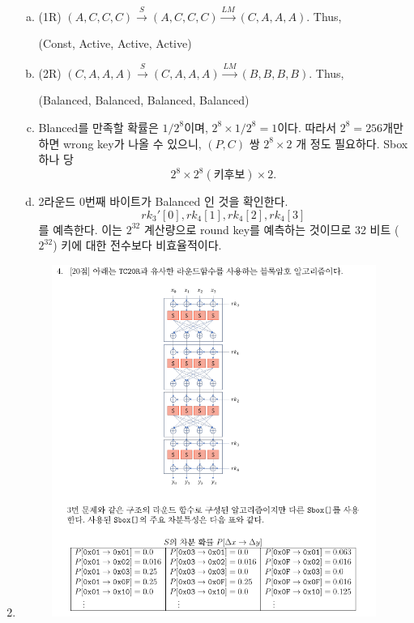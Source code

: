\begin{enumerate}[\bf 1.]
\begin{figure}[h!]
	\end{figure}
	\begin{enumerate}[(a)]
		\item (1R) $(A,C,C,C)\xrightarrow{S}(A,C,C,C)\xrightarrow{LM}(C,A,A,A)$. Thus, \begin{center}
			(Const, Active, Active, Active)
		\end{center}
		\item (2R) $(C,A,A,A)\xrightarrow{S}(C,A,A,A)\xrightarrow{LM}(B,B,B,B)$. Thus, \begin{center}
			(Balanced, Balanced, Balanced, Balanced)
		\end{center}
		\item Blanced를 만족할 확률은 $1/2^8$이며, $2^8\times 1/2^8=1$이다. 따라서 $2^8=256$개만 하면 wrong key가 나올 수 있으니, $(P,C)$ 쌍 $2^8\times 2$ 개 정도 필요하다. Sbox 하나 당 \[
		2^8\times 2^8(\text{키후보})\times 2.
		\]
		\item 2라운드 0번째 바이트가 Balanced 인 것을 확인한다. \[
		rk_3'[0], rk_4[1], rk_4[2], rk_4[3]
		\]를 예측한다. 이는 $2^{32}$ 계산량으로 round key를 예측하는 것이므로 32 비트 ($2^{32}$) 키에 대한 전수보다 비효율적이다.
	\end{enumerate}
	\item[]
	\begin{figure}[h!]\centering
		\includegraphics[scale=.6]{final2023-4}

\end{figure}
\end{enumerate}
